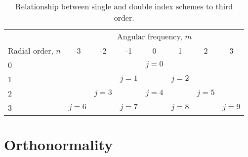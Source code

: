 \begin{appendices}
\begin{table}[H]
\caption{Relationship between single and double index schemes to third order.} %
\label{tab:single_index} %
\centering %
\begin{tabular}{l c c c c c c c} %
\toprule %
& \multicolumn{7}{c}{Angular frequency, $m$} \\ %
\cmidrule(l){2-8} %
Radial order, $n$ & -3 & -2 & -1 & 0 & 1 & 2 & 3\\ %
\midrule %
0 &   &   &  & $j=0$ &   &  &  \\ %
1 &  &   & $j=1$  &   & $j=2$  &   & \\ %
2 &   & $j=3$  &   & $j=4$  &   & $j=5$  & \\ %
3 & $j=6$  &   & $j=7$  &  & $j=8$  &   & $j=9$ \\ %
\midrule %
\midrule %
\end{tabular}
\end{table}
\FloatBarrier



\section{Orthonormality}	   \label{chap5:ortonormal}


\end{appendices}
